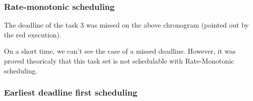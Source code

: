 \subsubsection{Rate-monotonic scheduling}

\begin{RTGrid}[width=10cm]{3}{20}







\end{RTGrid}

The deadline of the task 3 was missed on the above chronogram (pointed out by the red execution). \\

\begin{RTGrid}[width=10cm]{3}{22}







\end{RTGrid}

On a short time, we can't see the case of a missed deadline. However, it was proved theoricaly that this task set is not schedulable with Rate-Monotonic scheduling.

\subsubsection{Earliest deadline first scheduling}
